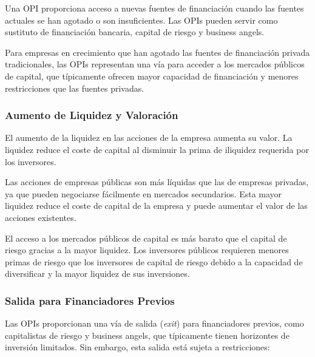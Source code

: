 \begin{proposicion}
Una OPI proporciona acceso a nuevas fuentes de financiación cuando las fuentes actuales se han agotado o son insuficientes. Las OPIs pueden servir como sustituto de financiación bancaria, capital de riesgo y business angels.
\end{proposicion}

Para empresas en crecimiento que han agotado las fuentes de financiación privada tradicionales, las OPIs representan una vía para acceder a los mercados públicos de capital, que típicamente ofrecen mayor capacidad de financiación y menores restricciones que las fuentes privadas.

\subsubsection{Aumento de Liquidez y Valoración}

\begin{proposicion}
El aumento de la liquidez en las acciones de la empresa aumenta su valor. La liquidez reduce el coste de capital al disminuir la prima de iliquidez requerida por los inversores.
\end{proposicion}

Las acciones de empresas públicas son más líquidas que las de empresas privadas, ya que pueden negociarse fácilmente en mercados secundarios. Esta mayor liquidez reduce el coste de capital de la empresa y puede aumentar el valor de las acciones existentes.

\begin{proposicion}
El acceso a los mercados públicos de capital es más barato que el capital de riesgo gracias a la mayor liquidez. Los inversores públicos requieren menores primas de riesgo que los inversores de capital de riesgo debido a la capacidad de diversificar y la mayor liquidez de sus inversiones.
\end{proposicion}

\subsubsection{Salida para Financiadores Previos}

Las OPIs proporcionan una vía de salida (\textit{exit}) para financiadores previos, como capitalistas de riesgo y business angels, que típicamente tienen horizontes de inversión limitados. Sin embargo, esta salida está sujeta a restricciones:

